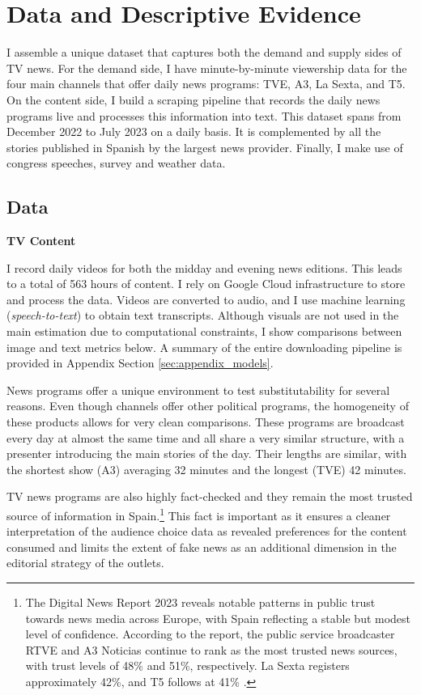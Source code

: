 \documentclass[12pt]{article}
\begin{document}
	
	
	
	
	
	\section{Data and Descriptive Evidence}
	\label{sec:data}
	
	I assemble a unique dataset that captures both the demand and supply sides of TV news. For the demand side, I have minute-by-minute viewership data for the four main channels that offer daily news programs: TVE, A3, La Sexta, and T5. On the content side, I build a scraping pipeline that records the daily news programs live and processes this information into text. This dataset spans from December 2022 to July 2023 on a daily basis. It is complemented by all the stories published in Spanish by the largest news provider. Finally, I make use of congress speeches, survey and weather data.
	
	\subsection{Data}
	
	\textbf{TV Content}
	
	I record daily  videos for both the midday and evening news editions. This leads to a total of 563 hours of content. I rely on Google Cloud infrastructure to store and process the data. Videos are converted to audio, and I use machine learning (\textit{speech-to-text}) to obtain text transcripts. Although visuals are not used in the main estimation due to computational constraints, I show comparisons between image and text metrics below. A summary of the entire downloading pipeline is provided in Appendix Section \ref{sec:appendix_models}.
	
	News programs offer a unique environment to test substitutability for several reasons. Even though channels offer other political programs, the homogeneity of these products allows for very clean comparisons. These programs are broadcast every day at almost the same time and all share a very similar structure, with a presenter introducing the main stories of the day. Their lengths are similar, with the shortest show (A3) averaging 32 minutes and the longest (TVE) 42 minutes.
	
	TV news programs are also highly fact-checked and they remain the most trusted source of information in Spain.\footnote{The Digital News Report 2023 reveals notable patterns in public trust towards news media across Europe, with Spain reflecting a stable but modest level of confidence. According to the report, the public service broadcaster RTVE and A3 Noticias continue to rank as the most trusted news sources, with trust levels of 48\% and 51\%, respectively. La Sexta registers  approximately 42\%, and T5 follows at 41\% \citep{reuters_dnr_2023}.} This fact is important as it ensures a cleaner interpretation of the audience choice data as revealed preferences for the content consumed and limits the extent of fake news as an additional dimension in the editorial strategy of the outlets. 
	
\end{document}
